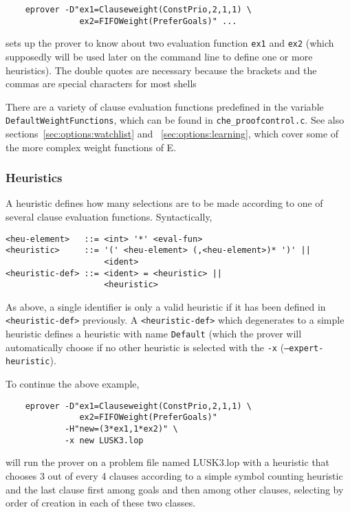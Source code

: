 \documentclass{article}
\begin{document}
\begin{example}
\begin{verbatim}
    eprover -D"ex1=Clauseweight(ConstPrio,2,1,1) \
               ex2=FIFOWeight(PreferGoals)" ...
\end{verbatim}
  sets up the prover to know about two evaluation function
  \texttt{ex1} and \texttt{ex2} (which supposedly will be used later on
  the command line to define one or more heuristics). The double
  quotes are necessary because the brackets and the commas are
  special characters for most shells
\end{example}

There are a variety of clause evaluation functions predefined in
the variable \texttt{DefaultWeightFunctions}, which can be found in
\texttt{che\_proofcontrol.c}. See also
sections~\ref{sec:options:watchlist} and ~\ref{sec:options:learning},
which cover some of the more complex weight functions of E.


\subsubsection{Heuristics}

A heuristic defines how many selections are to be made according to
one of several clause evaluation functions. Syntactically,

\begin{verbatim}
<heu-element>   ::= <int> '*' <eval-fun>
<heuristic>     ::= '(' <heu-element> (,<heu-element>)* ')' ||
                    <ident>
<heuristic-def> ::= <ident> = <heuristic> ||
                    <heuristic>
\end{verbatim}

As above, a single identifier is only a valid heuristic if it has been
defined in \texttt{<heuristic-def>} previously. A
\texttt{<heuristic-def>} which degenerates to a simple heuristic
defines a heuristic with name \texttt{Default} (which the prover will
automatically choose if no other heuristic is selected with the
\texttt{-x} (\texttt{--expert-heuristic}).

\begin{example}
  To continue the above example,
\begin{verbatim}
    eprover -D"ex1=Clauseweight(ConstPrio,2,1,1) \
               ex2=FIFOWeight(PreferGoals)" 
            -H"new=(3*ex1,1*ex2)" \
            -x new LUSK3.lop
\end{verbatim}
  will run the prover on a problem file named LUSK3.lop with a
  heuristic that chooses 3 out of every 4 clauses according to a
  simple symbol counting heuristic and the last clause first among
  goals and then among other clauses, selecting by order of creation
  in each of these two classes.
\end{example}
\end{document}
